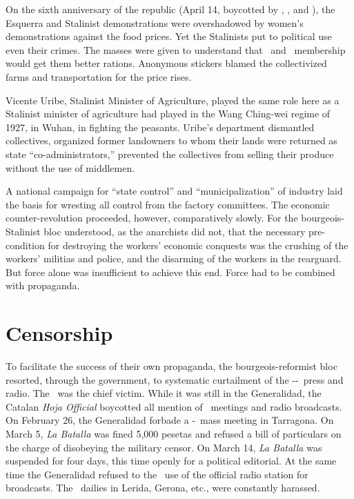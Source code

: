 On the sixth anniversary of the republic (April 14, boycotted by \FAI, \CNT, and \POUM), the Esquerra and Stalinist demonstrations were overshadowed by women’s demonstrations against the food prices. Yet the Stalinists put to political use even their crimes. The masses were given to understand that \PSUC\ and \UGT\ membership would get them better rations. Anonymous stickers blamed the collectivized farms and transportation for the price rises.

Vicente Uribe, Stalinist Minister of Agriculture, played the same role here as a Stalinist minister of agriculture had played in the Wang Ching-wei regime of 1927, in Wuhan, in fighting the peasants. Uribe’s department dismantled collectives, organized former landowners to whom their lands were returned as state ``co-administrators,'' prevented the collectives from selling their produce without the use of middlemen.

A national campaign for ``state control'' and ``municipalization'' of industry laid the basis for wresting all control from the factory committees. The economic counter-revolution proceeded, however, comparatively slowly. For the bourgeois-Stalinist bloc understood, as the anarchists did not, that the necessary pre-condition for destroying the workers’ economic conquests was the crushing of the workers’ militias and police, and the disarming of the workers in the rearguard. But force alone was insufficient to achieve this end. Force had to be combined with propaganda.

\section{Censorship}

To facilitate the success of their own propaganda, the bourgeois-reformist bloc resorted, through the government, to systematic curtailment of the \CNT-\FAI-\POUM\ press and radio. The \POUM\ was the chief victim. While it was still in the Generalidad, the Catalan \emph{Hoja Official} boycotted all mention of \POUM\ meetings and radio broadcasts. On February 26, the Generalidad forbade a \CNT-\POUM\ mass meeting in Tarragona. On March 5, \emph{La Batalla} was fined 5,000 pesetas and refused a bill of particulars on the charge of disobeying the military censor. On March 14, \emph{La Batalla} was suspended for four days, this time openly for a political editorial. At the same time the Generalidad refused to the \POUM\ use of the official radio station for broadcasts. The \POUM\ dailies in Lerida, Gerona, etc., were constantly harassed.

